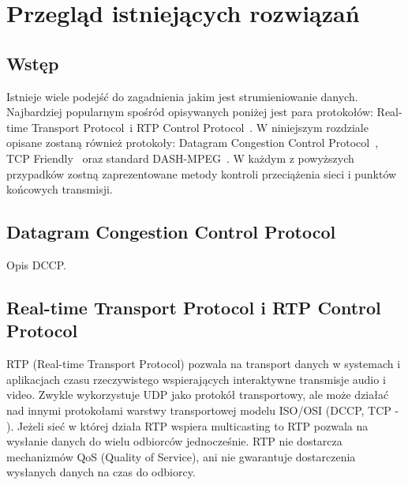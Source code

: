 \chapter{Przegląd istniejących rozwiązań}
\label{cha:rozdzial3}


\section{Wstęp}

Istnieje wiele podejść do zagadnienia jakim jest strumieniowanie danych. Najbardziej popularnym spośród opisywanych poniżej jest para protokołów: Real-time Transport Protocol~i RTP Control Protocol~\cite{RFC3550}. W niniejszym rozdziale opisane zostaną również protokoły: Datagram Congestion Control Protocol~\cite{RFC4340}, TCP Friendly~\cite{RFC5348} oraz standard DASH-MPEG~\cite{ISO-IEC-DASH}. W każdym z powyższych przypadków zostną zaprezentowane metody kontroli przeciążenia sieci i punktów końcowych transmisji.

\section{Datagram Congestion Control Protocol}

Opis DCCP.

\section{Real-time Transport Protocol i RTP Control Protocol}

RTP (Real-time Transport Protocol) pozwala na transport danych w systemach i aplikacjach czasu rzeczywistego wspierających interaktywne transmisje audio i video. Zwykle wykorzystuje UDP jako protokół transportowy, ale może działać nad innymi protokołami warstwy transportowej modelu ISO/OSI (DCCP, TCP - \cite{RFC3550, RFC5762}). Jeżeli sieć w której działa RTP wspiera multicasting to RTP pozwala na wysłanie danych do wielu odbiorców jednocześnie. RTP nie dostarcza mechanizmów QoS (Quality of Service), ani nie gwarantuje dostarczenia wysłanych danych na czas do odbiorcy.

